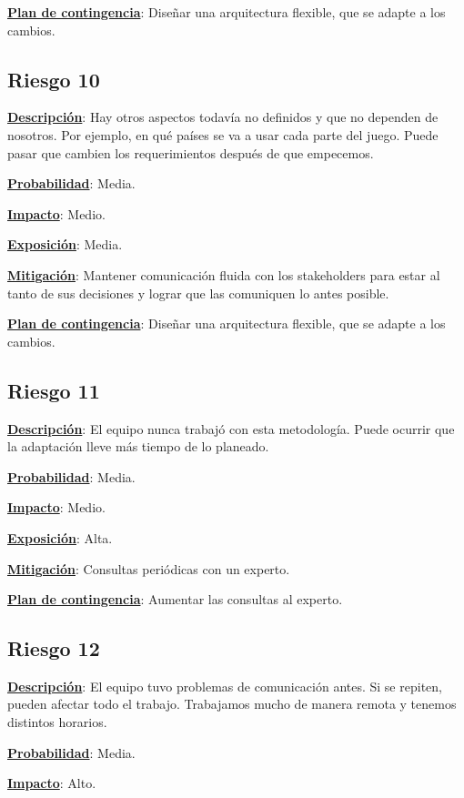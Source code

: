 \textbf{\underline{Plan de contingencia}}: Diseñar una arquitectura flexible, que se adapte a los cambios.

\subsection*{Riesgo 10}
\textbf{\underline{Descripción}}: Hay otros aspectos todavía no definidos y que no dependen de nosotros. Por ejemplo, en qué países se va a usar cada parte del juego. Puede pasar que cambien los requerimientos después de que empecemos.

\textbf{\underline{Probabilidad}}: Media.

\textbf{\underline{Impacto}}: Medio.

\textbf{\underline{Exposición}}: Media.

\textbf{\underline{Mitigación}}: Mantener comunicación fluida con los stakeholders para estar al tanto de sus decisiones y lograr que las comuniquen lo antes posible.

\textbf{\underline{Plan de contingencia}}: Diseñar una arquitectura flexible, que se adapte a los cambios.

\subsection*{Riesgo 11}
\textbf{\underline{Descripción}}: El equipo nunca trabajó con esta metodología. Puede ocurrir que la adaptación lleve más tiempo de lo planeado.

\textbf{\underline{Probabilidad}}: Media.

\textbf{\underline{Impacto}}: Medio.

\textbf{\underline{Exposición}}: Alta.

\textbf{\underline{Mitigación}}: Consultas periódicas con un experto.

\textbf{\underline{Plan de contingencia}}: Aumentar las consultas al experto.

\subsection*{Riesgo 12}
\textbf{\underline{Descripción}}: El equipo tuvo problemas de comunicación antes. Si se repiten, pueden afectar todo el trabajo. Trabajamos mucho de manera remota y tenemos distintos horarios.

\textbf{\underline{Probabilidad}}: Media.

\textbf{\underline{Impacto}}: Alto.

